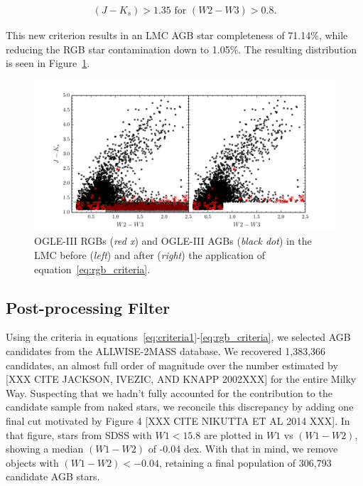 \begin{align}
(J-K_s) > 1.35 \text{ for } (W2-W3) > 0.8.\label{eq:rgb_criteria}
\end{align}

\noindent This new criterion results in an LMC AGB star completeness of 71.14\%, while reducing the RGB star contamination down to 1.05\%. The resulting distribution is seen in Figure~\ref{fig:rgbs_after_cut}.


\begin{figure}[h]
\includegraphics[width=6.5in]{figs/remove_rgbs.pdf}
\caption{OGLE-III RGBs (\emph{red x}) and OGLE-III AGBs (\emph{black dot}) in the LMC before (\emph{left}) and after (\emph{right}) the application of equation~\ref{eq:rgb_criteria}. 
\label{fig:rgbs_after_cut}}
\end{figure}

\subsection{Post-processing Filter}
Using the criteria in equations~\ref{eq:criteria1}-\ref{eq:rgb_criteria}, we selected AGB candidates from the ALLWISE-2MASS database. We recovered 1,383,366 candidates, an almost full order of magnitude over the number estimated by [XXX CITE JACKSON, IVEZIC, AND KNAPP 2002XXX] for the entire Milky Way. Suspecting that we hadn't fully accounted for the contribution to the candidate sample from naked stars, we reconcile this discrepancy by adding one final cut motivated by Figure 4 [XXX CITE NIKUTTA ET AL 2014 XXX]. In that figure, stars from SDSS with $W1 < 15.8$ are plotted in $W1$ vs $(W1-W2)$, showing a median $(W1-W2)$ of -0.04 dex. With that in mind, we remove objects with $(W1-W2) < -0.04$, retaining a final  population of 306,793 candidate AGB stars.





